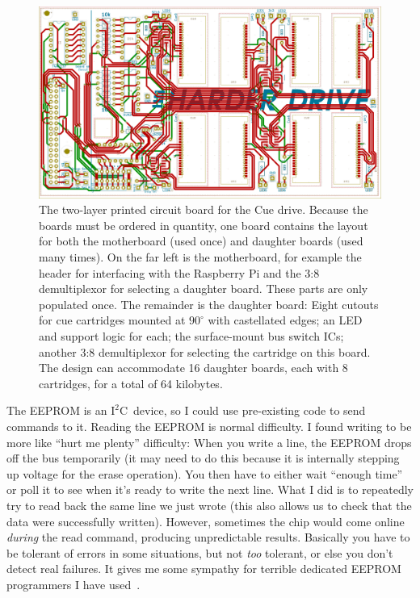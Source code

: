 \documentclass[twocolumn]{article}
\begin{document}
\begin{figure}[ht]
  \centering
  \includegraphics[width=\columnwidth]{pcb}
  \caption{ The two-layer printed circuit board for the Cue drive.
    Because the boards must be ordered in quantity, one board contains
    the layout for both the motherboard (used once) and daughter
    boards (used many times). On the far left is the motherboard, for
    example the header for interfacing with the Raspberry Pi and the
    3:8 demultiplexor for selecting a daughter board. These parts are
    only populated once. The remainder is the daughter board: Eight
    cutouts for cue cartridges mounted at $90^\circ$ with castellated
    edges; an LED and support logic for each; the surface-mount bus
    switch ICs; another 3:8 demultiplexor for selecting the cartridge
    on this board. The design can accommodate 16 daughter boards, each
    with 8 cartridges, for a total of 64 kilobytes. } \label{fig:pcb}
\end{figure}

\newcommand\itwoc{$\textrm{I}^2\textrm{C}$}

The EEPROM is an \itwoc\ device, so I could use pre-existing code to
send commands to it. Reading the EEPROM is normal difficulty. I found
writing to be more like ``hurt me plenty'' difficulty: When you write
a line, the EEPROM drops off the bus temporarily (it may need to do
this because it is internally stepping up voltage for the erase
operation). You then have to either wait ``enough time'' or poll it to
see when it's ready to write the next line. What I did is to
repeatedly try to read back the same line we just wrote (this also
allows us to check that the data were successfully written). However,
sometimes the chip would come online {\em during} the read command,
producing unpredictable results. Basically you have to be tolerant of
errors in some situations, but not {\em too} tolerant, or else you
don't detect real failures. It gives me some sympathy for terrible
dedicated EEPROM programmers I have used~\cite{murphy2018making}.
\end{document}
